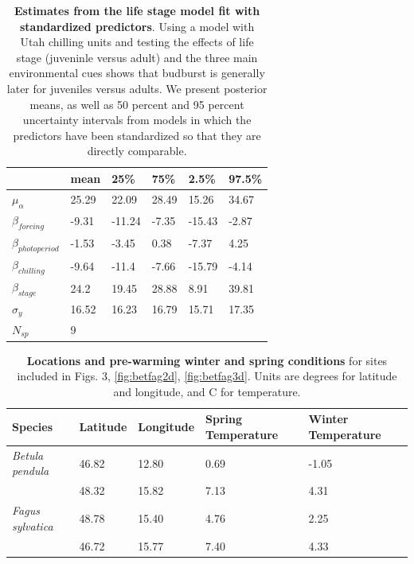 \documentclass{article}
\begin{document}
\begin{footnotesize}
\begin{table}[ht]
\centering
\caption{\textbf{Estimates from the life stage model fit with standardized predictors}. Using a model with Utah chilling units and testing the effects of life stage (juveninle versus adult) and the three main environmental cues shows that budburst is generally later for juveniles versus adults. We present posterior means, as well as 50 percent and 95 percent uncertainty intervals from models in which the predictors have been standardized so that they are directly comparable.} 
\label{tab:stage}
\begingroup\footnotesize
\begin{tabular}{|p{}|p{}p{}p{}p{}p{}|}
  \hline
 & mean & 25\% & 75\% & 2.5\% & 97.5\% \\ 
  \hline
$\mu_{\alpha}$ & 25.29 & 22.09 & 28.49 & 15.26 & 34.67 \\ 
  $\beta_{forcing}$ & -9.31 & -11.24 & -7.35 & -15.43 & -2.87 \\ 
  $\beta_{photoperiod}$ & -1.53 & -3.45 & 0.38 & -7.37 & 4.25 \\ 
  $\beta_{chilling}$ & -9.64 & -11.4 & -7.66 & -15.79 & -4.14 \\ 
  $\beta_{stage}$ & 24.2 & 19.45 & 28.88 & 8.91 & 39.81 \\ 
  $\sigma_{y}$ & 16.52 & 16.23 & 16.79 & 15.71 & 17.35 \\ 
   \hline
$N_{sp}$ & 9 &  &  &  &  \\ 
   \hline
\end{tabular}
\endgroup
\end{table}

\begin{table}[ht]
\centering
\caption{\textbf{Locations and pre-warming winter and spring conditions} for sites included in Figs. 3, \ref{fig:betfag2d}, \ref{fig:betfag3d}. Units are degrees for latitude and longitude, and \degree C for temperature. } 
\label{tab:clim}
\begingroup\footnotesize
\begin{tabular}{|p{}|p{}|p{}|p{}|p{}|}
  \hline
Species & Latitude & Longitude & Spring Temperature & Winter Temperature \\ 
  \hline
\textit{Betula pendula} & 46.82 & 12.80 & 0.69 & -1.05 \\ 
  \textit{} & 48.32 & 15.82 & 7.13 & 4.31 \\ 
  \textit{Fagus sylvatica} & 48.78 & 15.40 & 4.76 & 2.25 \\ 
  \textit{} & 46.72 & 15.77 & 7.40 & 4.33 \\ 
   \hline
\end{tabular}
\endgroup
\end{table}



\end{footnotesize}
\end{document}

